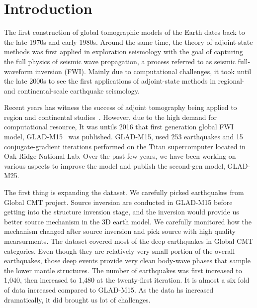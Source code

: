 \chapter{Introduction\label{ch:intro}}

The first construction of global tomographic models of the Earth
dates back to the late 1970s and early 1980s.
Around the same time, the theory of adjoint-state methods was
first applied in exploration seismology with the goal of
capturing the full physics of seismic wave propagation,
a process referred to as seismic full-waveform inversion (FWI).
Mainly due to computational challenges, it took until the late
2000s to see the first applications of adjoint-state methods
in regional- and continental-scale earthquake seismology.

Recent years has witness the success of adjoint tomography being
applied to region and continental studies~\cite{tape2009adjoint, zhu2012structure,
chen2015multiparameter}. However, due to the high demand for computational
resource,
It was untils 2016 that first generation global FWI model,
GLAD-M15~\cite{bozdaug2016global} was published.
GLAD-M15, used 253 earthquakes and
15 conjugate-gradient iterations performed
on the Titan supercomputer located in Oak Ridge National Lab.
Over the past few years, we have been working on various aspects to improve
the model and publish the second-gen model, GLAD-M25.

The first thing is expanding the dataset. We carefully picked
earthquakes from Global CMT project\cite{ekstrom2012global}. Source inversion
are conducted in GLAD-M15 before getting into the structure inversion stage,
and the inversion would provide us better source mechanism in the 3D earth model.
We carefully monitored how the mechanism changed
after source inversion and pick source with high quality mearsurments.
The dataset covered most of the deep earthquakes in Global CMT categories.
Even though they are relatively very small portion of
the overall earthquakes, those deep events provide very clean body-wave phases
that sample the lower mantle structures.
The number of earthquakes was first increased to 1,040, then increased to 1,480 at
the twenty-first iteration.
It is almost a six fold of data increased compared to GLAD-M15. As the data
hs increased dramatically, it did brought us lot of challenges.

